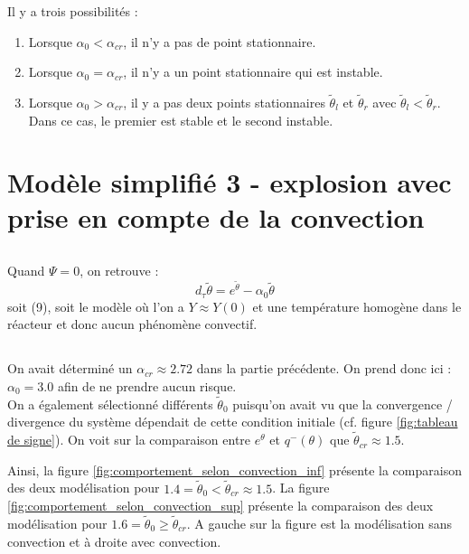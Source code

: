 \documentclass[10pt,a4paper,twocolumn]{report}
\begin{document}
	\subsubsection{} %
	Il y a trois possibilités : 
	\begin{enumerate}
		\item Lorsque $\alpha_0 < \alpha_{cr}$,  il n'y a pas de point stationnaire.
		\item Lorsque $\alpha_0 = \alpha_{cr}$,  il n'y a un point stationnaire qui est instable.
		\item Lorsque $\alpha_0 > \alpha_{cr}$,  il y a pas deux points stationnaires $\tilde{\theta}_l$ et $\tilde{\theta}_r$ avec $\tilde{\theta}_l < \tilde{\theta}_r$. Dans ce cas, le premier est stable et le second instable.
	\end{enumerate}


\section{Modèle simplifié 3 - explosion avec prise en compte de la convection}

\subsection{} %

Quand $\Psi = 0$, on retrouve : 
$$ d_\tau\tilde{\theta} = e^{\tilde{\theta}} - \alpha_0 \tilde{\theta} $$
soit (9), soit le modèle où l'on a $Y \approx Y(0)$ et une température homogène dans le réacteur et donc aucun phénomène convectif.

\subsection{} %

On avait déterminé un $\alpha_{cr} \approx 2.72$ dans la partie précédente. On prend donc ici : $\alpha_0 = 3.0$ afin de ne prendre aucun risque. \\

On a également sélectionné différents $\tilde{\theta}_0$ puisqu'on avait vu que la convergence / divergence du système dépendait de cette condition initiale (cf. figure \ref{fig:tableau de signe}). On voit sur la comparaison entre $e^{\theta}$ et $q^{-}(\theta)$ que $\tilde{\theta}_{cr} \approx 1.5$.  

Ainsi, la figure \ref{fig:comportement_selon_convection_inf} présente la comparaison des deux modélisation pour $1.4 = \tilde{\theta}_0 < \tilde{\theta}_{cr} \approx 1.5$. La figure \ref{fig:comportement_selon_convection_sup} présente la comparaison des deux modélisation pour $1.6 = \tilde{\theta}_0 \geq \tilde{\theta}_{cr}$. A gauche sur la figure est la modélisation sans convection et à droite avec convection. 
\end{document}
